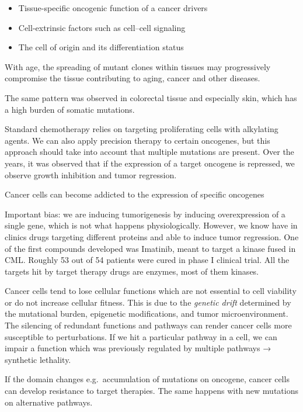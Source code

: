 \begin{itemize}
\tightlist
\item
  Tissue-specific oncogenic function of a cancer drivers
\item
  Cell-extrinsic factors such as cell--cell signaling
\item
  The cell of origin and its differentiation status
\end{itemize}

With age, the spreading of mutant clones within tissues may progressively compromise the tissue contributing to aging, cancer and other diseases.

The same pattern was observed in colorectal tissue and especially skin, which has a high burden of somatic mutations.

Standard chemotherapy relies on targeting proliferating cells with alkylating agents. We can also apply precision therapy to certain oncogenes, but this approach should take into account that multiple mutations are present. Over the years, it was observed that if the expression of a target oncogene is repressed, we observe growth inhibition and tumor regression.

Cancer cells can become addicted to the expression of specific oncogenes

Important bias: we are inducing tumorigenesis by inducing overexpression of a single gene, which is not what happens physiologically. However, we know have in clinics drugs targeting different proteins and able to induce tumor regression. One of the first compounds developed was Imatinib, meant to target a kinase fused in CML. Roughly 53 out of 54 patients were cured in phase I clinical trial. All the targets hit by target therapy drugs are enzymes, most of them kinases.

Cancer cells tend to lose cellular functions which are not essential to cell viability or do not increase cellular fitness. This is due to the \emph{genetic drift} determined by the mutational burden, epigenetic modifications, and tumor microenvironment. The silencing of redundant functions and pathways can render cancer cells more susceptible to perturbations. If we hit a particular pathway in a cell, we can impair a function which was previously regulated by multiple pathways → synthetic lethality.

If the domain changes e.g.~accumulation of mutations on oncogene, cancer cells can develop resistance to target therapies. The same happens with new mutations on alternative pathways.

